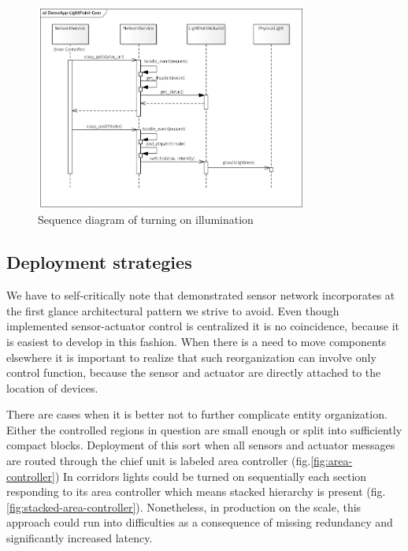 \documentclass[11pt, english, a4paper, twoside]{article}
\begin{document}
\begin{figure}[h!]
	\centering
	\includegraphics[width=0.8\textwidth]{DemoApp-LightPoint-Com.png}
	\caption{Sequence diagram of turning on illumination}
	\label{fig:sequence-light}
\end{figure}

\subsection{Deployment strategies}
We have to self-critically note that demonstrated sensor network incorporates at the first glance architectural pattern we strive to avoid. Even though implemented sensor-actuator control is centralized it is no coincidence, because it is easiest to develop in this fashion. When there is a need to move components elsewhere it is important to realize that such reorganization can involve only control function, because the sensor and actuator are directly attached to the location of devices.

There are cases when it is better not to further complicate entity organization. Either the controlled regions in question are small enough or split into sufficiently compact blocks. Deployment of this sort when all sensors and actuator messages are routed through the chief unit is labeled area controller (fig.\ref{fig:area-controller}) In corridors lights could be turned on sequentially each section responding to its area controller which means stacked hierarchy is present (fig.\ref{fig:stacked-area-controller}). Nonetheless, in production on the scale, this approach could run into difficulties as a consequence of missing redundancy and significantly increased latency. 
\end{document}
